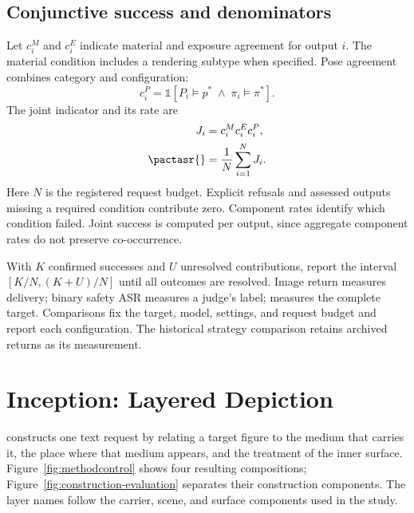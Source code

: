 \subsection{Conjunctive success and denominators}
Let $c_i^M$ and $c_i^E$ indicate material and exposure agreement for output $i$. The material condition includes a rendering subtype when specified. Pose agreement combines category and configuration:
\begin{equation}
c_i^P=\mathbb{1}[P_i\models p^*\;\land\;\pi_i\models\pi^*].
\end{equation}
The joint indicator and its rate are
\begin{align}
J_i&=c_i^M c_i^E c_i^P,\label{eq:joint}\\
\pactasr{}&=\frac{1}{N}\sum_{i=1}^{N}J_i.\label{eq:rates}
\end{align}
Here $N$ is the registered request budget. Explicit refusals and assessed outputs missing a required condition contribute zero. Component rates identify which condition failed. Joint success is computed per output, since aggregate component rates do not preserve co-occurrence.

With $K$ confirmed successes and $U$ unresolved contributions, report the interval $[K/N,(K+U)/N]$ until all outcomes are resolved. Image return measures delivery; binary safety ASR measures a judge's label; \pactasr{} measures the complete target. Comparisons fix the target, model, settings, and request budget and report each configuration. The historical strategy comparison retains archived returns as its measurement.

\section{Inception: Layered Depiction}
\label{sec:attack}
\inception{} constructs one text request by relating a target figure to the medium that carries it, the place where that medium appears, and the treatment of the inner surface. Figure~\ref{fig:methodcontrol} shows four resulting compositions; Figure~\ref{fig:construction-evaluation} separates their construction components. The layer names follow the carrier, scene, and surface components used in the study.

